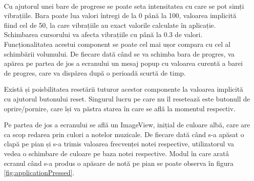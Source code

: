 \documentclass[../IoMusT.tex]{subfiles}
\begin{document}
\\
\par Cu ajutorul unei bare de progrese se poate seta intensitatea cu care se pot simți vibrațiile. Bara poate lua valori întregi de la 0 până la 100, valoarea implicită fiind cel de 50, la care vibrațiile au exact valorile calculate în aplicație. Schimbarea cursorului va afecta vibrațiile cu
 până la 0.3 de valori. Funcționalitatea acestui component se poate cel mai ușor compara cu cel al schimbării volumului. De fiecare dată când se va schimba bara de progres, va apărea pe partea de jos a ecranului un mesaj popup cu valoarea curentă a barei de progres, care va dispărea după o perioadă scurtă de timp.
\\
\par Există și poisbilitatea resetării tuturor acestor componente la valoarea implicită cu ajutorul butonului reset. Singurul lucru pe care nu îl resetează este butonull de oprire/pornire, care își va păstra starea în care se află la momentul respectiv.
\\
\par Pe partea de jos a ecranului se află un ImageView, inițial de culoare albă, care are ca scop redarea prin culori a notelor muzicale. De fiecare dată când s-a apăsat o clapă pe pian și s-a trimis valoarea frecvenței notei respective, utilizatorul va vedea o schimbare de culoare pe baza notei respective. Modul în care aratâ ecranul când s-a produs o apăsare de notă pe pian se poate observa în figura \ref{fig:applicationPressed}.
\end{document}
